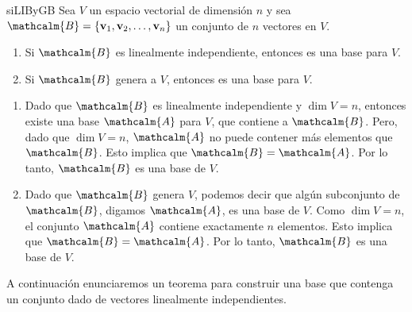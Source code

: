 \begin{theorem}{}{siLIByGB}
    Sea $V$ un espacio vectorial de dimensión $n$ y sea $\mathcalm{B} = \{\mathbf{v}_1, \mathbf{v}_2, \dots, \mathbf{v}_n\}$ un conjunto de $n$ vectores en $V$.
    \begin{enumerate}[label=\roman*), topsep=6pt, itemsep=0pt]
        \item Si $\mathcalm{B}$ es linealmente independiente, entonces es una base para $V$.
        \item Si $\mathcalm{B}$ genera a $V$, entonces es una base para $V$.
    \end{enumerate}

    \tcblower
    \demostracion
    \begin{enumerate}[label=\roman*), topsep=6pt, itemsep=0pt]
        \item Dado que $\mathcalm{B}$ es linealmente independiente y $\dim V = n$, entonces existe una base $\mathcalm{A}$ para $V$, que contiene a $\mathcalm{B}$. Pero, dado que $\dim V = n$, $\mathcalm{A}$ no puede contener más elementos que $\mathcalm{B}$. Esto implica que $\mathcalm{B} = \mathcalm{A}$. Por lo tanto, $\mathcalm{B}$ es una base de $V$.
        \item Dado que $\mathcalm{B}$ genera $V$, podemos decir que algún subconjunto de $\mathcalm{B}$, digamos $\mathcalm{A}$, es una base de $V$. Como $\dim V = n$, el conjunto $\mathcalm{A}$ contiene exactamente $n$ elementos. Esto implica que $\mathcalm{B} = \mathcalm{A}$. Por lo tanto, $\mathcalm{B}$ es una base de $V$.
    \end{enumerate}
\end{theorem}

A continuación enunciaremos un teorema para construir una base que contenga un conjunto dado de vectores linealmente independientes.

